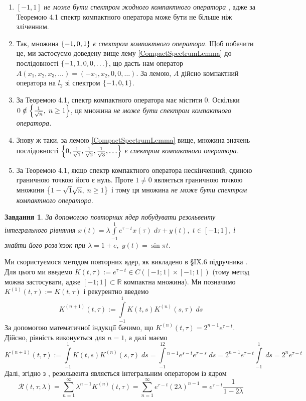 \documentclass[12pt]{article} %
\newtheorem{prob}{Завдання}
\newcommand{\ds}{\;ds}
\let\oldint\int
\renewcommand{\int}{\oldint\limits}
\begin{document}
\begin{enumerate}
	\renewcommand{\labelenumi}{\myralph{enumi})}
\item{$[-1,1]$ {\it не може бути спектром жодного компактного оператора}
	, адже за Теоремою 4.1 спектр компактного оператора може бути не більше ніж зліченним.}
	\item{Так, множина $\left\{-1,0,1\right\}$ {\it є спектром компактного оператора}. Щоб побачити це, ми застосуємо доведену вище лему
		\ref{CompactSpectrumLemma} до
		послідовності $\left\{-1,1,0,0,\hdots\right\}$, що дасть нам оператор $A(x_1,x_2,x_3,\hdots)=(-x_1,x_2,0,0,\hdots)$. За лемою, $A$
		дійсно компактний оператора на $l_2$ зі спектром $\left\{-1,0,1\right\}$.}
	\item{За Теоремою 4.1, спектр компактного оператора має містити 0. Оскільки $0\notin\left\{\frac{1}{\sqrt{n}},\;n\geq 1\right\}$, ця множина
		{\it не може бути спектром компактного оператора.}}
	\item{Знову ж таки, за лемою \ref{CompactSpectrumLemma} вище, множина значень послідовності
		$\left\{0,\frac{1}{\sqrt{1}},\frac{1}{\sqrt{2}},\frac{1}{\sqrt{3}},\hdots\right\}$ {\it є спектром компактного оператора.}}
	\item{За Теоремою 4.1, якщо спектр компактного оператора нескінченний, єдиною граничною точкою його є нуль. Проте $1\neq 0$ являється
		граничною точкою множини $\left\{1-\sqrt{1}{\sqrt{n}},\;n\geq 1\right\}$ і тому ця множина {\it 
		не може бути спектром компактного оператора.}}
\end{enumerate}
\begin{prob}За допомогою повторних ядер побудувати резольвенту інтегрального рівняння $x(t)=\lambda
	\displaystyle\int_{-1}^{1}e^{\tau-t}x(\tau)\;d\tau+
	y(t),\;t\in[-1;1]$, і знайти його розв’язок при $\lambda=1+e,\;y(t)=\sin\pi t$.\end{prob}
	Ми скористуємося методом повторних ядер, як викладено в \S IX.6 підручника
	\cite{tb}. Для цього ми введемо $K(t,\tau):=e^{\tau-t}\in
	C([-1;1]\times[-1;1])$ (тому метод можна застосувати, адже $[-1;1]\subset\mathbb{R}$
	компактна множина). Ми позначимо $K^{(1)}(t,
	\tau):=K(t,\tau)$ і рекурентно введемо
	\[K^{(n+1)}(t,\tau):=\int_{-1}^1 K(t,s)K^{(n)}(s,\tau)\ds\]
	За допомогою математичної індукції бачимо, що $K^{(n)}(t,\tau)=2^{n-1}e^{\tau-t}$. Дійсно, рівність виконується для
	$n=1$, а далі маємо
	\[K^{(n+1)}(t,\tau):=\int
	_{-1}^1 K(t,s)K^{(n)}(s,\tau)\ds=\int_{-1}^12^{n-1}e^{s-t}e^{\tau-s}\ds=2^{n-1}e^{\tau-t}\int_{-1}^1\ds=2^ne^{\tau-t}\]
	Далі, згідно з \cite{tb}, резольвента являється інтегральним оператором із ядром
	\[\mathcal{R}(t,\tau;\lambda)=\sum_{n=1}^\infty \lambda^{n-1}K^{(n)}(t,\tau)=\sum_{n=1}^\infty e^{\tau-t}(2\lambda)^{n-1}
	=e^{\tau-t}\frac{1}{1-2\lambda}\]
\end{document}
